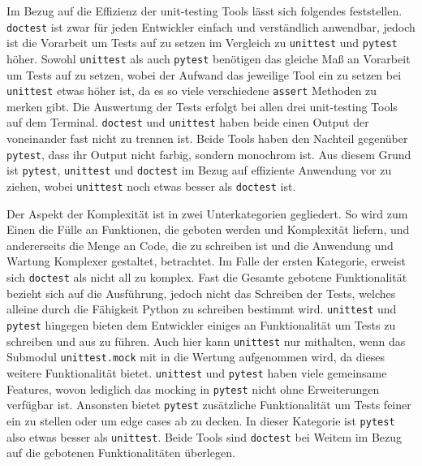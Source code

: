 Im Bezug auf die Effizienz der unit-testing Tools lässt sich folgendes
feststellen. \lstinline{doctest} ist zwar für jeden Entwickler einfach und
verständlich anwendbar, jedoch ist die Vorarbeit um Tests auf zu setzen im
Vergleich zu \lstinline{unittest} und \lstinline{pytest} höher. Sowohl
\lstinline{unittest} als auch \lstinline{pytest} benötigen das gleiche Maß an
Vorarbeit um Tests auf zu setzen, wobei der Aufwand das jeweilige Tool ein zu
setzen bei \lstinline{unittest} etwas höher ist, da es so viele verschiedene
\lstinline{assert} Methoden zu merken gibt. Die Auswertung der Tests erfolgt
bei allen drei unit-testing Tools auf dem Terminal. \lstinline{doctest} und
\lstinline{unittest} haben beide einen Output der voneinander fast nicht zu
trennen ist. Beide Tools haben den Nachteil gegenüber \lstinline{pytest}, dass
ihr Output nicht farbig, sondern monochrom ist.  Aus diesem Grund ist 
\lstinline{pytest}, \lstinline{unittest} und \lstinline{doctest} im Bezug auf
effiziente Anwendung vor zu ziehen, wobei \lstinline{unittest} noch etwas 
besser als \lstinline{doctest} ist.
\newline

Der Aspekt der Komplexität ist in zwei Unterkategorien gegliedert. So wird zum 
Einen die Fülle an Funktionen, die geboten werden und Komplexität liefern, und
andererseits die Menge an Code, die zu schreiben ist und die Anwendung und
Wartung Komplexer gestaltet, betrachtet. Im Falle der ersten Kategorie, erweist 
sich \lstinline{doctest} als nicht all zu komplex. Fast die Gesamte gebotene
Funktionalität bezieht sich auf die Ausführung, jedoch nicht das Schreiben der
Tests, welches alleine durch die Fähigkeit Python zu schreiben bestimmt wird.
\lstinline{unittest} und \lstinline{pytest} hingegen bieten dem Entwickler
einiges an Funktionalität um Tests zu schreiben und aus zu führen. Auch hier
kann \lstinline{unittest} nur mithalten, wenn das Submodul
\lstinline{unittest.mock} mit in die Wertung aufgenommen wird, da dieses
weitere Funktionalität bietet. \lstinline{unittest} und \lstinline{pytest}
haben viele gemeinsame Features, wovon lediglich das \gls{mock}ing in
\lstinline{pytest} nicht ohne Erweiterungen verfügbar ist. Ansonsten bietet
\lstinline{pytest} zusätzliche Funktionalität um Tests feiner ein zu
stellen oder um edge cases ab zu decken. In dieser Kategorie ist
\lstinline{pytest} also etwas besser als \lstinline{unittest}. Beide Tools
sind \lstinline{doctest} bei Weitem im Bezug auf die gebotenen Funktionalitäten 
überlegen.

